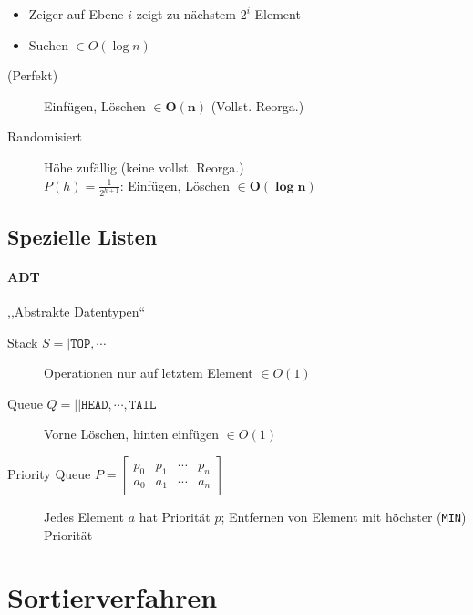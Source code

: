 \begin{mzImportant}
  \begin{itemize}
    \item Zeiger auf Ebene $i$ zeigt zu nächstem $2^i$ Element
    \item Suchen $\in O(\log n)$
  \end{itemize}

  \begin{description}
    \item [(Perfekt)]
          Einfügen, Löschen $\mathbf{\in O(n)}$ (Vollst. Reorga.)

    \item [Randomisiert]
          Höhe zufällig (keine vollst. Reorga.) \\
          $P(h) = \frac{1}{2^{h + 1}}$: Einfügen, Löschen $\mathbf{\in O(\log n)}$
  \end{description}
\end{mzImportant}

\subsection{Spezielle Listen}

\paragraph{ADT} ,,Abstrakte Datentypen``

\begin{description}
  \item [Stack $S = | \texttt{TOP}, \cdots$]
        Operationen nur auf letztem Element $\in O(1)$

  \item [Queue $Q = || \texttt{HEAD}, \cdots, \texttt{TAIL}$]
        Vorne Löschen, hinten einfügen $\in O(1)$

  \item [Priority Queue $P = \begin{bmatrix}
            p_0 & p_1 & \cdots & p_n \\
            a_0 & a_1 & \cdots & a_n
          \end{bmatrix}$]
        Jedes Element $a$ hat Priorität $p$; Entfernen von Element mit höchster (\texttt{MIN}) Priorität
\end{description}

\section{Sortierverfahren}


